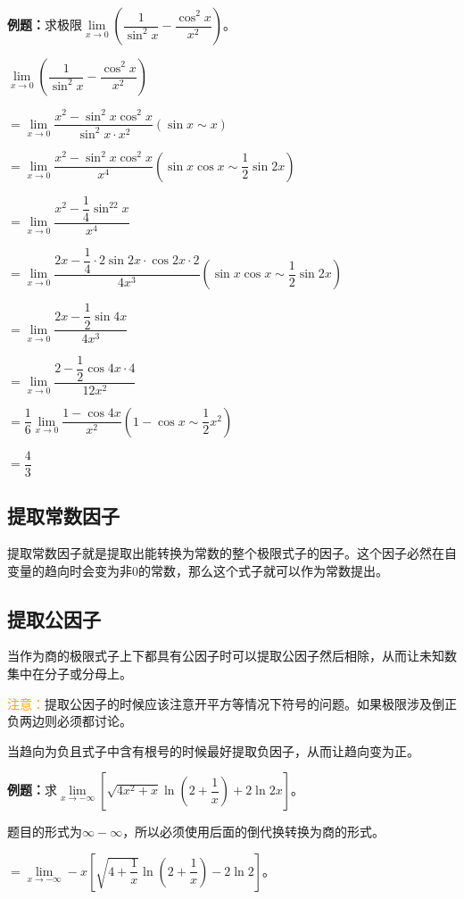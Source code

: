 \textbf{例题：}求极限$\lim\limits_{x\to 0}\left(\dfrac{1}{\sin^2x}-\dfrac{\cos^2x}{x^2}\right)$。\medskip

$\lim\limits_{x\to 0}\left(\dfrac{1}{\sin^2x}-\dfrac{\cos^2x}{x^2}\right)$ \medskip

$= \lim\limits_{x\to 0}\dfrac{x^2-\sin^2x\cos^2x}{\sin^2x\cdot x^2} (\sin x\sim x)$ \medskip

$= \lim\limits_{x\to 0}\dfrac{x^2-\sin^2x\cos^2x}{x^4} (\sin x\cos x\sim\dfrac{1}{2}\sin 2x)$ \medskip

$= \lim\limits_{x\to 0}\dfrac{x^2-\dfrac{1}{4}\sin^22x}{x^4}$ \medskip

$= \lim\limits_{x\to 0}\dfrac{2x-\dfrac{1}{4}\cdot 2\sin 2x\cdot\cos 2x\cdot 2}{4x^3} (\sin x\cos x\sim\dfrac{1}{2}\sin 2x)$ \medskip

$= \lim\limits_{x\to 0}\dfrac{2x-\dfrac{1}{2}\sin 4x}{4x^3}$ \medskip

$= \lim\limits_{x\to 0}\dfrac{2-\dfrac{1}{2}\cos 4x\cdot 4}{12x^2}$ \medskip

$= \dfrac{1}{6}\lim\limits_{x\to 0}\dfrac{1-\cos 4x}{x^2} (1-\cos x\sim \dfrac{1}{2}x^2)$ \medskip

$= \dfrac{4}{3}$

\subsection{提取常数因子}

提取常数因子就是提取出能转换为常数的整个极限式子的因子。这个因子必然在自变量的趋向时会变为非0的常数，那么这个式子就可以作为常数提出。

\subsection{提取公因子}

当作为商的极限式子上下都具有公因子时可以提取公因子然后相除，从而让未知数集中在分子或分母上。

\textcolor{orange}{注意：}提取公因子的时候应该注意开平方等情况下符号的问题。如果极限涉及倒正负两边则必须都讨论。

当趋向为负且式子中含有根号的时候最好提取负因子，从而让趋向变为正。\medskip

\textbf{例题：}求$\lim\limits_{x\to-\infty}\left[\sqrt{4x^2+x}\ln\left(2+\dfrac{1}{x}\right)+2\ln 2x\right]$。\medskip

题目的形式为$\infty-\infty$，所以必须使用后面的倒代换转换为商的形式。\medskip

$=\lim\limits_{x\to-\infty}-x\left[\sqrt{4+\dfrac{1}{x}}\ln\left(2+\dfrac{1}{x}\right)-2\ln 2\right]$。 \medskip

